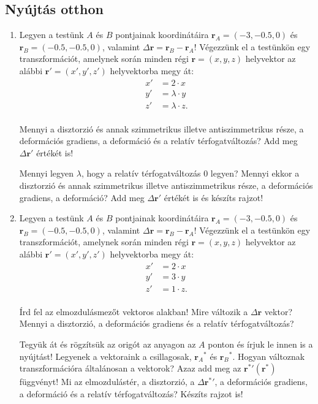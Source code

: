 \documentclass[12pt,a4paper]{scrartcl}
\let\mathbf\bm
\begin{document}
\subsection{Nyújtás otthon}
\begin{enumerate}
\item Legyen a testünk $A$ és $B$ pontjainak koordinátáira ${{\mathbf{r}}_A} = \left( { - 3, - 0.5, 0} \right)$ és ${{\mathbf{r}}_B} = \left( { - 0.5, - 0.5, 0} \right)$, valamint $\Delta {\mathbf{r}} = {{\mathbf{r}}_B} - {{\mathbf{r}}_A}$! Végezzünk el a testünkön egy transzformációt, amelynek során minden régi ${\mathbf{r}} = \left( {x,y,z} \right)$ helyvektor az alábbi ${\mathbf{r}}' = \left( {x',y',z'} \right)$ helyvektorba megy át: 
\[\begin{aligned}
  x' &  = 2 \cdot x \\ 
  y' &  = \lambda \cdot y \\ 
  z' &  = \lambda  \cdot z. \\ 
\end{aligned} \]

Mennyi a disztorzió és annak szimmetrikus illetve antiszimmetrikus része, a deformációs gradiens, a deformáció és a relatív térfogatváltozás? Add meg $\Delta {\mathbf{r}}'$ értékét is!

Mennyi legyen $\lambda$, hogy a relatív térfogatváltozás 0 legyen? Mennyi ekkor a disztorzió és annak szimmetrikus illetve antiszimmetrikus része, a deformációs gradiens, a deformáció? Add meg $\Delta {\mathbf{r}}'$ értékét is és készíts rajzot!

\item Legyen a testünk $A$ és $B$ pontjainak koordinátáira ${{\mathbf{r}}_A} = \left( { - 3, - 0.5, 0} \right)$ és ${{\mathbf{r}}_B} = \left( { - 0.5, - 0.5, 0} \right)$, valamint $\Delta {\mathbf{r}} = {{\mathbf{r}}_B} - {{\mathbf{r}}_A}$! Végezzünk el a testünkön egy transzformációt, amelynek során minden régi ${\mathbf{r}} = \left( {x,y,z} \right)$ helyvektor az alábbi ${\mathbf{r}}' = \left( {x',y',z'} \right)$ helyvektorba megy át: 
\[\begin{aligned}
  x' &  = 2 \cdot x \\ 
  y' &  = 3 \cdot y \\ 
  z' &  = 1 \cdot z. \\ 
\end{aligned} \]

Írd fel az elmozdulásmezőt vektoros alakban! Mire változik a $\Delta {\mathbf{r}}$ vektor? Mennyi a disztorzió, a deformációs gradiens és a relatív térfogatváltozás?

Tegyük át és rögzítsük az origót az anyagon az $A$ ponton és írjuk le innen is a nyújtást! Legyenek a vektoraink a csillagosak, ${{\mathbf{r}}_A}^*$ és ${{\mathbf{r}}_B}^*$. Hogyan változnak transzformációra általánosan a vektorok? Azaz add meg az ${\mathbf{r}}{{^*}'}\left( {{{\mathbf{r}}^ * }} \right)$ függvényt! Mi az elmozdulástér, a disztorzió, a $\Delta {{\mathbf{r}}^ * }'$, a deformációs gradiens, a deformáció és a relatív térfogatváltozás? Készíts rajzot is!
\end{enumerate}
\end{document}
